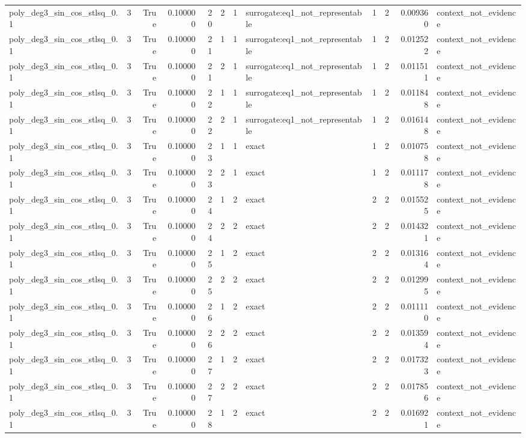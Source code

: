 \begin{tabular}{lrrrrrrlrrrl}
poly\_deg3\_sin\_cos\_stlsq\_0.1 & 3 & True & 0.100000 & 20 & 2 & 1 & surrogate:eq1\_not\_representable & 1 & 2 & 0.009360 & context\_not\_evidence \\
poly\_deg3\_sin\_cos\_stlsq\_0.1 & 3 & True & 0.100000 & 21 & 1 & 1 & surrogate:eq1\_not\_representable & 1 & 2 & 0.012522 & context\_not\_evidence \\
poly\_deg3\_sin\_cos\_stlsq\_0.1 & 3 & True & 0.100000 & 21 & 2 & 1 & surrogate:eq1\_not\_representable & 1 & 2 & 0.011511 & context\_not\_evidence \\
poly\_deg3\_sin\_cos\_stlsq\_0.1 & 3 & True & 0.100000 & 22 & 1 & 1 & surrogate:eq1\_not\_representable & 1 & 2 & 0.011848 & context\_not\_evidence \\
poly\_deg3\_sin\_cos\_stlsq\_0.1 & 3 & True & 0.100000 & 22 & 2 & 1 & surrogate:eq1\_not\_representable & 1 & 2 & 0.016148 & context\_not\_evidence \\
poly\_deg3\_sin\_cos\_stlsq\_0.1 & 3 & True & 0.100000 & 23 & 1 & 1 & exact & 1 & 2 & 0.010758 & context\_not\_evidence \\
poly\_deg3\_sin\_cos\_stlsq\_0.1 & 3 & True & 0.100000 & 23 & 2 & 1 & exact & 1 & 2 & 0.011178 & context\_not\_evidence \\
poly\_deg3\_sin\_cos\_stlsq\_0.1 & 3 & True & 0.100000 & 24 & 1 & 2 & exact & 2 & 2 & 0.015525 & context\_not\_evidence \\
poly\_deg3\_sin\_cos\_stlsq\_0.1 & 3 & True & 0.100000 & 24 & 2 & 2 & exact & 2 & 2 & 0.014321 & context\_not\_evidence \\
poly\_deg3\_sin\_cos\_stlsq\_0.1 & 3 & True & 0.100000 & 25 & 1 & 2 & exact & 2 & 2 & 0.013164 & context\_not\_evidence \\
poly\_deg3\_sin\_cos\_stlsq\_0.1 & 3 & True & 0.100000 & 25 & 2 & 2 & exact & 2 & 2 & 0.012995 & context\_not\_evidence \\
poly\_deg3\_sin\_cos\_stlsq\_0.1 & 3 & True & 0.100000 & 26 & 1 & 2 & exact & 2 & 2 & 0.011110 & context\_not\_evidence \\
poly\_deg3\_sin\_cos\_stlsq\_0.1 & 3 & True & 0.100000 & 26 & 2 & 2 & exact & 2 & 2 & 0.013594 & context\_not\_evidence \\
poly\_deg3\_sin\_cos\_stlsq\_0.1 & 3 & True & 0.100000 & 27 & 1 & 2 & exact & 2 & 2 & 0.017323 & context\_not\_evidence \\
poly\_deg3\_sin\_cos\_stlsq\_0.1 & 3 & True & 0.100000 & 27 & 2 & 2 & exact & 2 & 2 & 0.017856 & context\_not\_evidence \\
poly\_deg3\_sin\_cos\_stlsq\_0.1 & 3 & True & 0.100000 & 28 & 1 & 2 & exact & 2 & 2 & 0.016921 & context\_not\_evidence \\

\end{tabular}
